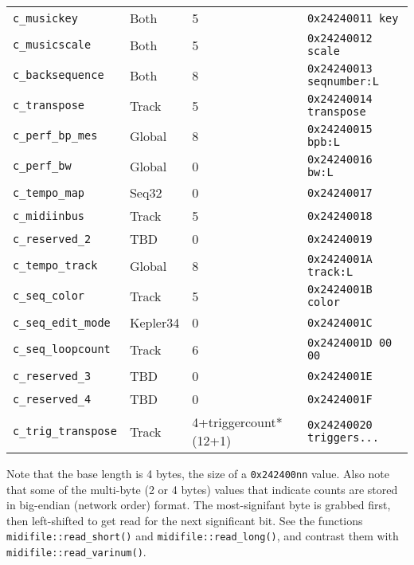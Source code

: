 \begin{table}[htb]
\begin{tabular}{l l l l}
         \texttt{c\_musickey}        & Both          & 5                 & \texttt{0x24240011 key} \\
         \texttt{c\_musicscale}      & Both          & 5                 & \texttt{0x24240012 scale} \\
         \texttt{c\_backsequence}    & Both          & 8                 & \texttt{0x24240013 seqnumber:L} \\
         \texttt{c\_transpose}       & Track         & 5                 & \texttt{0x24240014 transpose} \\
         \texttt{c\_perf\_bp\_mes}   & Global        & 8                 & \texttt{0x24240015 bpb:L} \\
         \texttt{c\_perf\_bw}        & Global        & 0                 & \texttt{0x24240016 bw:L} \\
         \texttt{c\_tempo\_map}      & Seq32         & 0                 & \texttt{0x24240017} \\
         \texttt{c\_midiinbus}       & Track         & 5                 & \texttt{0x24240018} \\
         \texttt{c\_reserved\_2}     & TBD           & 0                 & \texttt{0x24240019} \\
         \texttt{c\_tempo\_track}    & Global        & 8                 & \texttt{0x2424001A track:L} \\
         \texttt{c\_seq\_color}      & Track         & 5                 & \texttt{0x2424001B color} \\
         \texttt{c\_seq\_edit\_mode} & Kepler34      & 0                 & \texttt{0x2424001C} \\
         \texttt{c\_seq\_loopcount}  & Track         & 6                 & \texttt{0x2424001D 00 00} \\
         \texttt{c\_reserved\_3}     & TBD           & 0                 & \texttt{0x2424001E} \\
         \texttt{c\_reserved\_4}     & TBD           & 0                 & \texttt{0x2424001F} \\
         \texttt{c\_trig\_transpose} & Track     & 4+triggercount*(12+1) & \texttt{0x24240020 triggers...} \\
      \end{tabular}
   \end{table}

   Note that the base length is 4 bytes, the size of a \texttt{0x242400nn}
   value.  Also note that some of the multi-byte (2 or 4 bytes) values that
   indicate counts are stored in big-endian (network order) format.  The
   most-signifant byte is grabbed first, then
   left-shifted to get read for the next significant bit.
   See the functions
   \texttt{midifile::read\_short()} and
   \texttt{midifile::read\_long()}, and contrast them with
   \texttt{midifile::read\_varinum()}.

